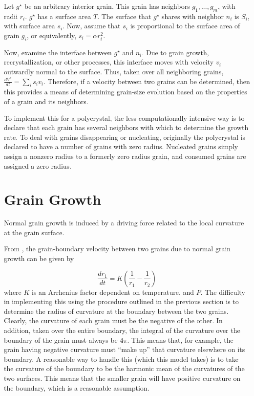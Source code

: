 \documentclass[TC, hvmath, online]{copernicus}
\begin{document}
{Let $g^{\star}$ be an arbitrary interior grain. This grain has neighbors $g_1,...,g_m$, with radii $r_i$. $g^{\star}$ has a surface area $T$. The surface that $g^{\star}$ shares with neighbor $n_i$ is $S_i$, with surface area $s_i$. Now, assume that $s_i$ is proportional to the surface area of grain $g_i$, or equivalently, $s_i=\alpha r_i^2$.

Now, examine the interface between $g^{\star}$ and $n_i$. Due to grain growth, recrystallization, or other processes, this interface moves with velocity $v_i$ outwardly normal to the surface. Thus, taken over all neighboring grains, $\frac{dV^{\star}}{dt}=\sum_{i}s_i v_i$. Therefore, if a velocity between two grains can be determined, then this provides a means of determining grain-size evolution based on the properties of a grain and its neighbors.

To implement this for a polycrystal, the less computationally intensive way is to declare that each grain has several neighbors with which to determine the growth rate. To deal with grains disappearing or nucleating, originally the polycrystal is declared to have a number of grains with zero radius. Nucleated grains simply assign a nonzero radius to a formerly zero radius grain, and consumed grains are assigned a zero radius. 

\section{Grain Growth}
Normal grain growth is induced by a driving force related to the local curvature at the grain surface.

From \citet{durand2006}, the grain-boundary velocity between two grains due to normal grain growth can be given by

\[\frac{dr_1}{dt} = K \left( \frac{1}{r_1}-\frac{1}{r_2} \right)
\]
where $K$ is an Arrhenius factor dependent on temperature, and $P$. The difficulty in implementing this using the procedure outlined in the previous section is to determine the radius of curvature at the boundary between the two grains. Clearly, the curvature of each grain must be the negative of the other. In addition, taken over the entire boundary, the integral of the curvature over the boundary of the grain must always be $4 \pi$. This means that, for example, the grain having negative curvature must ``make up'' that curvature elsewhere on its boundary. A reasonable way to handle this (which this model takes)  is to take the curvature of the boundary to be the harmonic mean of the curvatures of the two surfaces. This means that the smaller grain will have positive curvature on the boundary, which is a reasonable assumption. 

}
\end{document}
